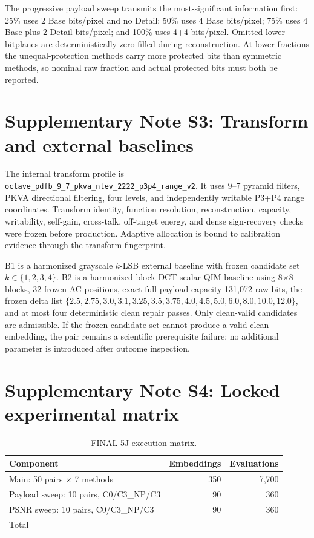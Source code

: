 \documentclass[10pt]{article}
\newcommand{\code}[1]{\texttt{#1}}
\begin{document}
The progressive payload sweep transmits the most-significant information first: 25\% uses 2 Base bits/pixel and no Detail; 50\% uses 4 Base bits/pixel; 75\% uses 4 Base plus 2 Detail bits/pixel; and 100\% uses 4+4 bits/pixel. Omitted lower bitplanes are deterministically zero-filled during reconstruction. At lower fractions the unequal-protection methods carry more protected bits than symmetric methods, so nominal raw fraction and actual protected bits must both be reported.

\section*{Supplementary Note S3: Transform and external baselines}
The internal transform profile is \code{octave\_pdfb\_9\_7\_pkva\_nlev\_2222\_p3p4\_range\_v2}. It uses 9--7 pyramid filters, PKVA directional filtering, four levels, and independently writable P3+P4 range coordinates. Transform identity, function resolution, reconstruction, capacity, writability, self-gain, cross-talk, off-target energy, and dense sign-recovery checks were frozen before production. Adaptive allocation is bound to calibration evidence through the transform fingerprint.

B1 is a harmonized grayscale $k$-LSB external baseline with frozen candidate set $k\in\{1,2,3,4\}$. B2 is a harmonized block-DCT scalar-QIM baseline using 8$\times$8 blocks, 32 frozen AC positions, exact full-payload capacity 131,072 raw bits, the frozen delta list \(\{2.5,2.75,3.0,3.1,3.25,3.5,3.75,4.0,4.5,5.0,6.0,8.0,10.0,12.0\}\), and at most four deterministic clean repair passes. Only clean-valid candidates are admissible. If the frozen candidate set cannot produce a valid clean embedding, the pair remains a scientific prerequisite failure; no additional parameter is introduced after outcome inspection.

\section*{Supplementary Note S4: Locked experimental matrix}
\begin{table}[t]
\centering
\caption{FINAL-5J execution matrix.}
\label{tab:s-final-matrix}
\begin{tabular}{lrr}
\toprule
Component & Embeddings & Evaluations \\
\midrule
Main: 50 pairs $\times$ 7 methods & 350 & 7,700 \\
Payload sweep: 10 pairs, C0/C3\_NP/C3 & 90 & 360 \\
PSNR sweep: 10 pairs, C0/C3\_NP/C3 & 90 & 360 \\
\midrule
Total & \FinalEmbeddings{} & \FinalEvaluations{} \\
\bottomrule
\end{tabular}
\end{table}
\end{document}
